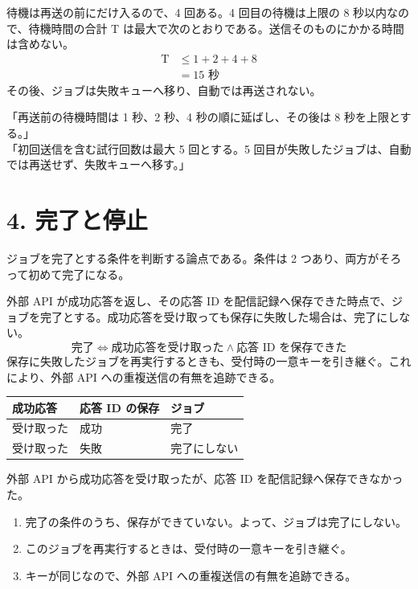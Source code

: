 \documentclass[10pt]{article}
\begin{document}
\begin{reidai}[5 回とも失敗したときの待機時間の合計]
待機は再送の前にだけ入るので、4 回ある。4 回目の待機は上限の 8 秒以内なので、待機時間の合計 $\mathrm{T}$ は最大で次のとおりである。送信そのものにかかる時間は含めない。
\begin{align}
  \mathrm{T} &\leq 1 + 2 + 4 + 8 \\
             &= 15 \text{ 秒}
\end{align}
その後、ジョブは失敗キューへ移り、自動では再送されない。
\end{reidai}

\begin{genbun}
「再送前の待機時間は 1 秒、2 秒、4 秒の順に延ばし、その後は 8 秒を上限とする。」\\
「初回送信を含む試行回数は最大 5 回とする。5 回目が失敗したジョブは、自動では再送せず、失敗キューへ移す。」
\end{genbun}

\section{4. 完了と停止}
ジョブを完了とする条件を判断する論点である。条件は 2 つあり、両方がそろって初めて完了になる。

\begin{youten}
外部 API が成功応答を返し、その応答 ID を配信記録へ保存できた時点で、ジョブを完了とする。成功応答を受け取っても保存に失敗した場合は、完了にしない。
\begin{equation}
  \text{完了} \iff \text{成功応答を受け取った} \land \text{応答 ID を保存できた}
\end{equation}
保存に失敗したジョブを再実行するときも、受付時の一意キーを引き継ぐ。これにより、外部 API への重複送信の有無を追跡できる。
\end{youten}

\begin{tabular}{lll}
\toprule
成功応答 & 応答 ID の保存 & ジョブ \\
\midrule
受け取った & 成功 & 完了 \\
受け取った & 失敗 & 完了にしない \\
\bottomrule
\end{tabular}

\begin{reidai}[成功応答の後に保存へ失敗した場合]
外部 API から成功応答を受け取ったが、応答 ID を配信記録へ保存できなかった。
\begin{enumerate}
  \item 完了の条件のうち、保存ができていない。よって、ジョブは完了にしない。
  \item このジョブを再実行するときは、受付時の一意キーを引き継ぐ。
  \item キーが同じなので、外部 API への重複送信の有無を追跡できる。
\end{enumerate}
\end{reidai}
\end{document}
